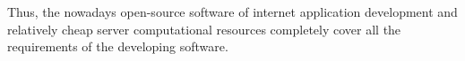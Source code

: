 \documentclass[conference]{IEEEtran}
\begin{document}
Thus, the nowadays open-source software of internet application
development and relatively cheap server computational resources
completely cover all the requirements of the developing software.






%
%



%
%
\end{document}
